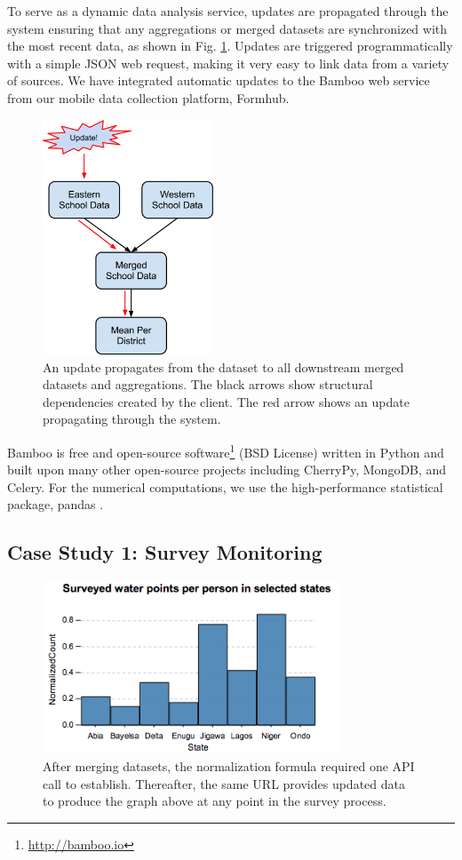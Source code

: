 \documentclass{acm_proc_article-sp}
\begin{document}
To serve as a dynamic data analysis service, updates are propagated through the system ensuring that any aggregations or merged datasets are synchronized with the most recent data, as shown in Fig. \ref{fig:updates}.  Updates are triggered programmatically with a simple JSON web request, making it very easy to link data from a variety of sources.  We have integrated automatic updates to the Bamboo web service from our mobile data collection platform, Formhub.

\begin{figure}
\centering
\includegraphics[width=2in]{figures/update_flow}
\caption{An update propagates from the dataset to all downstream merged datasets and aggregations.  The black arrows show structural dependencies created by the client.  The red arrow shows an update propagating through the system.}
\label{fig:updates}
\end{figure}

Bamboo is free and open-source software\footnote{\url{http://bamboo.io}} (BSD License) written in Python and built upon many other open-source projects including CherryPy, MongoDB, and Celery.  For the numerical computations, we use the high-performance statistical package, pandas \cite{mckinney}.

\subsection{Case Study 1: Survey Monitoring}

\begin{figure}
\centering
\includegraphics[width=3.5in]{figures/summary.png}
\caption{After merging datasets, the normalization formula required one API call to establish. Thereafter, the same URL provides updated data to produce the graph above at any point in the survey process.}
\label{fig:summary}
\end{figure}
\end{document}
